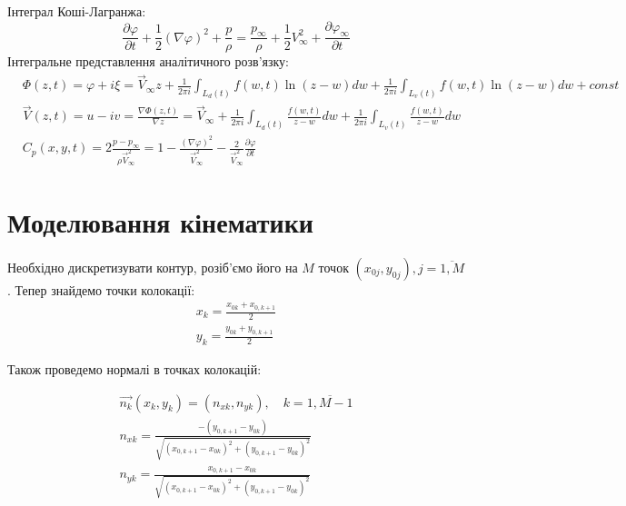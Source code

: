 \documentclass[a4paper,12pt]{article}
\begin{document}
	Інтеграл Коші-Лагранжа:
	\[
	\frac{\partial \varphi}{\partial t} + \frac{1}{2}\left( \nabla \varphi \right)^2 + \frac{p}{\rho} = \frac{p_{\infty}}{\rho} + \frac{1}{2} V_{\infty}^2 + \frac{\partial \varphi_{\infty}}{\partial t}
	\]
	Інтегральне представлення аналітичного розв'язку:
	\begin{align}
	&\Phi(z,t) = \varphi + i\xi = \vec{V}_\infty z + \frac{1}{2 \pi i} \int_{L_d(t)} f(w,t) \ln{(z - w)}dw + \frac{1}{2 \pi i} \int_{L_v(t)} f(w,t) \ln{(z - w)}dw + const \nonumber \\
	&\vec{V}(z,t) = u- iv = \frac{\nabla \Phi(z,t)}{\nabla z} = \vec{V}_\infty + \frac{1}{2 \pi i} \int_{L_d(t)} \frac{f(w,t)}{z - w} dw + \frac{1}{2 \pi i} \int_{L_v(t)} \frac{f(w,t)}{z - w} dw \nonumber \\
	&C_p(x,y,t) = 2 \frac{p - p_\infty}{\rho \vec{V}_\infty^2} = 1 - \frac{(\nabla \varphi)^2}{\vec{V}_\infty^2} - \frac{2}{\vec{V}_\infty^2} \frac{\partial \varphi}{\partial t} \nonumber
	\end{align}
	\section{Моделювання кінематики}
	
	Необхідно дискретизувати контур, розіб'ємо його на $M$ точок $(x_{0j}, y_{0j}), j = \overline{1,M}$. Тепер знайдемо точки колокації:
	\begin{eqnarray}
	x_k = \frac{x_{0k} + x_{0, k+1}}{2} \nonumber \\
	y_k = \frac{y_{0k} + y_{0, k+1}}{2} \nonumber
	\end{eqnarray}
	
	Також проведемо нормалі в точках колокацій:
	
	\begin{align} 
	\overrightarrow{n_k} (x_k, y_k) = (n_{xk}, n_{yk}),\quad  k = \overline{1, M-1} \nonumber \\
	n_{xk} = \frac{-(y_{0,k+1} - y_{0k})}{\sqrt{(x_{0, k+1} -  x_{0k})^2 + (y_{0,k+1} - y_{0k})^2}} \nonumber \\
	n_{yk} = \frac{x_{0, k+1} -  x_{0k}}{\sqrt{(x_{0, k+1} -  x_{0k})^2 + (y_{0,k+1} - y_{0k})^2}} \nonumber
	\end{align}
	
\end{document}
